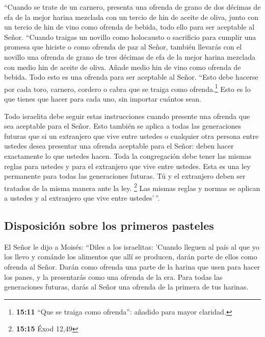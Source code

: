  ``Cuando se trate de un carnero, presenta una ofrenda de
grano de dos décimas de efa de la mejor harina mezclada con un tercio de
hin de aceite de oliva,  junto con un tercio de hin de
vino como ofrenda de bebida, todo ello para ser aceptable al Señor.
 ``Cuando traigas un novillo como holocausto o sacrificio
para cumplir una promesa que hiciste o como ofrenda de paz al Señor,
 también llevarás con el novillo una ofrenda de grano de
tres décimas de efa de la mejor harina mezclada con medio hin de aceite
de oliva.  Añade medio hin de vino como ofrenda de
bebida. Todo esto es una ofrenda para ser aceptable al Señor.
 ``Esto debe hacerse por cada toro, carnero, cordero o
cabra que se traiga como ofrenda.\footnote{\textbf{15:11} ``Que se
  traiga como ofrenda'': añadido para mayor claridad.} 
Esto es lo que tienes que hacer para cada uno, sin importar cuántos
sean.

 Todo israelita debe seguir estas instrucciones cuando
presente una ofrenda que sea aceptable para el Señor. 
Esto también se aplica a todas las generaciones futuras que si un
extranjero que vive entre ustedes o cualquier otra persona entre ustedes
desea presentar una ofrenda aceptable para el Señor: deben hacer
exactamente lo que ustedes hacen.  Toda la congregación
debe tener las mismas reglas para ustedes y para el extranjero que vive
entre ustedes. Esta es una ley permanente para todas las generaciones
futuras. Tú y el extranjero deben ser tratados de la misma manera ante
la ley. \footnote{\textbf{15:15} Éxod 12,49}  Las mismas
reglas y normas se aplican a ustedes y al extranjero que vive entre
ustedes'\,''.

\hypertarget{disposiciuxf3n-sobre-los-primeros-pasteles}{%
\subsection{Disposición sobre los primeros
pasteles}\label{disposiciuxf3n-sobre-los-primeros-pasteles}}

 El Señor le dijo a Moisés:  ``Diles a los
israelitas: 'Cuando lleguen al país al que yo los llevo 
y cománde los alimentos que allí se producen, darán parte de ellos como
ofrenda al Señor.  Darán como ofrenda una parte de la
harina que usen para hacer los panes, y la presentarás como una ofrenda
de la era.  Para todas las generaciones futuras, darás al
Señor una ofrenda de la primera de tus harinas.


